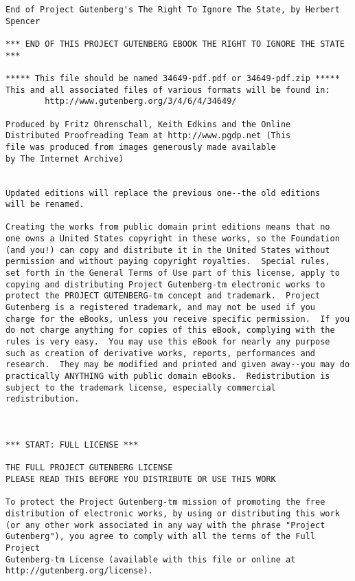\documentclass[oneside]{book}
\begin{document}
\newpage
\small
{}
\begin{verbatim}
End of Project Gutenberg's The Right To Ignore The State, by Herbert Spencer

*** END OF THIS PROJECT GUTENBERG EBOOK THE RIGHT TO IGNORE THE STATE ***

***** This file should be named 34649-pdf.pdf or 34649-pdf.zip *****
This and all associated files of various formats will be found in:
        http://www.gutenberg.org/3/4/6/4/34649/

Produced by Fritz Ohrenschall, Keith Edkins and the Online
Distributed Proofreading Team at http://www.pgdp.net (This
file was produced from images generously made available
by The Internet Archive)


Updated editions will replace the previous one--the old editions
will be renamed.

Creating the works from public domain print editions means that no
one owns a United States copyright in these works, so the Foundation
(and you!) can copy and distribute it in the United States without
permission and without paying copyright royalties.  Special rules,
set forth in the General Terms of Use part of this license, apply to
copying and distributing Project Gutenberg-tm electronic works to
protect the PROJECT GUTENBERG-tm concept and trademark.  Project
Gutenberg is a registered trademark, and may not be used if you
charge for the eBooks, unless you receive specific permission.  If you
do not charge anything for copies of this eBook, complying with the
rules is very easy.  You may use this eBook for nearly any purpose
such as creation of derivative works, reports, performances and
research.  They may be modified and printed and given away--you may do
practically ANYTHING with public domain eBooks.  Redistribution is
subject to the trademark license, especially commercial
redistribution.



*** START: FULL LICENSE ***

THE FULL PROJECT GUTENBERG LICENSE
PLEASE READ THIS BEFORE YOU DISTRIBUTE OR USE THIS WORK

To protect the Project Gutenberg-tm mission of promoting the free
distribution of electronic works, by using or distributing this work
(or any other work associated in any way with the phrase "Project
Gutenberg"), you agree to comply with all the terms of the Full Project
Gutenberg-tm License (available with this file or online at
http://gutenberg.org/license).



\end{verbatim}
\end{document}
